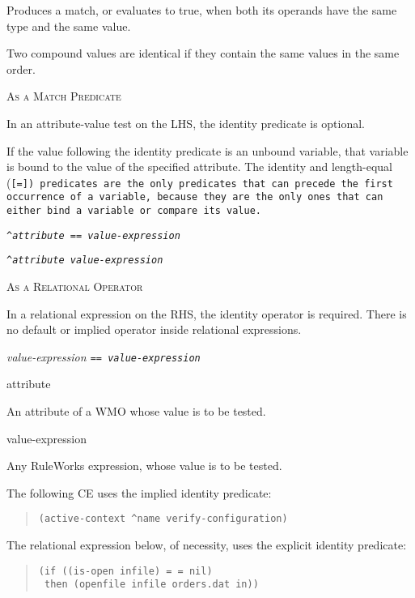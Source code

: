 Produces a match, or evaluates to true, when both its operands have
the same type and the same value.

Two compound values are identical if they contain the same values in
the same order.

\textsc{As a Match Predicate}

In an attribute-value test on the LHS, the identity predicate is
optional.

If the value following the identity predicate is an unbound variable,
that variable is bound to the value of the specified attribute. The
identity and length-equal (\tt{[=]}) predicates are the only
predicates that can precede the first occurrence of a variable,
because they are the only ones that can either bind a variable or
compare its value.

\Format

\tt{\^}\it{attribute} \tt{==} \it{value-expression}

\tt{\^}\it{attribute} \it{value-expression}

\textsc{As a Relational Operator}
\nopagebreak

In a relational expression on the RHS, the identity operator is
required. There is no default or implied operator inside relational
expressions.

\Format

\it{value-expression} \tt{==} \it{value-expression}

\begin{operands}
\item[\ct attribute]

  An attribute of a WMO whose value is to be tested.

\item[value-expression]

  Any RuleWorks expression, whose value is to be tested.
\end{operands}

\Example

The following CE uses the implied identity predicate:

\begin{quote}
\begin{verbatim}
(active-context ^name verify-configuration)
\end{verbatim}
\end{quote}

The relational expression below, of necessity, uses the explicit
identity predicate:

\begin{quote}
\begin{verbatim}
(if ((is-open infile) = = nil)
 then (openfile infile orders.dat in))
\end{verbatim}
\end{quote}

